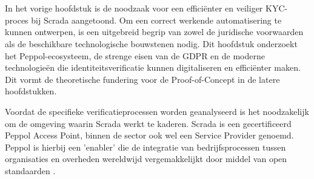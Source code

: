 \usetikzlibrary{arrows.meta, shapes.geometric, calc}


\chapter{}%
\label{ch:stand-van-zaken}



In het vorige hoofdstuk is de noodzaak voor een efficiënter en veiliger KYC-proces bij Scrada aangetoond. 
Om een correct werkende automatisering te kunnen ontwerpen, is een uitgebreid begrip van zowel de juridische voorwaarden als de beschikbare technologische bouwstenen nodig. 
Dit hoofdstuk onderzoekt het Peppol-ecosysteem, de strenge eisen van de GDPR en de moderne technologieën die identiteitsverificatie kunnen digitaliseren en efficiënter maken. 
Dit vormt de theoretische fundering voor de Proof-of-Concept in de latere hoofdstukken.

\label{sec:het Peppol-ecosysteem en de rol van Scrada}
Voordat de specifieke verificatieprocessen worden geanalyseerd 
is het noodzakelijk om de omgeving waarin Scrada werkt te kaderen. 
Scrada is een gecertificeerd Peppol Access Point, binnen de sector ook wel een Service Provider genoemd. 
Peppol is hierbij een 'enabler' die de integratie van bedrijfsprocessen tussen organisaties en overheden wereldwijd 
vergemakkelijkt door middel van open standaarden \autocite{OpenPeppolMain2024}.

